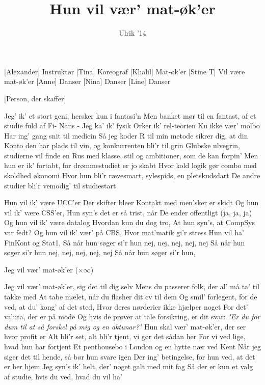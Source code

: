 \documentclass[a4paper,11pt]{article}
\title{Hun vil vær' mat-øk'er}
\author{Ulrik '14}
\begin{document}
\maketitle

\begin{roles}
[Alexander] Instruktør
[Tina] Koreograf
[Khalil] Mat-øk'er
[Stine T] Vil være mat-øk'er
[Anne] Danser
[Nina] Danser
[Line] Danser
\end{roles}

\begin{props}
[Person, der skaffer]
\end{props}


\begin{song}
 Jeg' ik' et stort geni, hersker kun i fantasi'n
Men banket mør til en fantast, af et studie fuld af Fi-
Nans - Jeg ka' ik' fysik
Orker ik' rel-teorien
Ku ikke vær' molbo
Har ing' gang snit til medicin
Så jeg koder R til min metode sikrer dig, at din
Konto den har plads til vin, og konkurrenten bli'r til grin
Glubske ulvegrin, studierne vil finde en
Rus med klasse, stil og ambitioner, som de kan forpin'
Men hun er ik' fortabt, for drømmestudiet er jo skabt
Hvor kold logik gør combo med skoldhed økonomi
Hvor hun bli'r rævesmart, sylespids, en pletskudsdart
De andre studier bli'r vemodig' til studiestart

 Hun vil ik' være UCC'er
Der skifter bleer
Kontakt med men'sker er skidt
Og hun vil ik' være CSS'er,
Hun syn's det er så trist, når
De ender offentligt (ja, ja, ja)
Og hun vil ik' være datalog
Hvordan kun du dog tro,
At hun syn's, at CompSys var fedt?
Og hun vil ik' vær' på CBS,
Hvor mat'matik gi'r stress
Hun vil ha' FinKont og Stat1,
Så når hun søger si'r hun nej, nej, nej, nej, nej
Så når hun søger si'r hun nej, nej, nej, nej, nej
Så når hun søger si'r hun,

 Jeg vil vær' mat-øk'er ($\times\infty$)

 Jeg vil vær' mat-øk'er, sig det til dig selv
Mens du passerer folk, der al' må ta' til takke med
At tabe mælet, når du flasher dit cv til dem
Og smil' forlegent, for de ved, at du' kong' af det sted,
Hvor deres nørderier ikke hjælper noget
For det' valuta, der er på mode
Og hvis de prøver at tale forsikring, er dit svar:
\textit{"Er du for dum til at så forskel på mig og en aktunar?"}
Hun skal vær' mat-øk'er, der ser hvor profit er
Alt bli'r set, alt bli'r tjent, vi gør det sådan her
For vi ved lige, hvad hun har fortjent
Et penthousebo i London og en hytte nær ved Kent
Når jeg siger det til hende, så bør hun svare igen
Der ing' betingelse, for hun ved, at det er her hjem
Jeg syn's ik' helt, der' noget galt med mit fag
Så der er kun et valg af studie, hvis du ved, hvad du vil ha'


\end{song}
\end{document}
